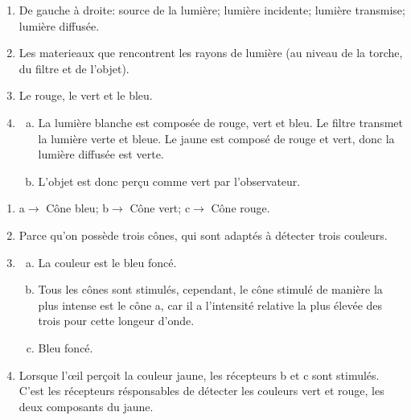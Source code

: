 \documentclass[12pt, a4paper]{article}
\begin{document}
    \begin{Exercise}[number={24}]
        \begin{enumerate}[1.]
            \item	De gauche à droite: source de la lumière; lumière incidente; lumière transmise; lumière diffusée.
            \item   Les materieaux que rencontrent les rayons de lumière (au niveau de la torche, du filtre et de l'objet).
            \item   Le rouge, le vert et le bleu.
            \item   \begin{enumerate}[a.]
                        \item   La lumière blanche est composée de rouge, vert et bleu. Le filtre transmet la lumière verte et bleue. Le jaune est composé de rouge et vert, donc la lumière diffusée est verte.
                        \item   L'objet est donc perçu comme vert par l'observateur.
                    \end{enumerate}
        \end{enumerate}
    \end{Exercise}

    \begin{Exercise}[number={27}]
        \begin{enumerate}[1.]
            \item	{\large\textcircled{\small{a}}}$\rightarrow$ Cône bleu; {\large\textcircled{\small{b}}}$\rightarrow$ Cône vert; {\large\textcircled{\small{c}}}$\rightarrow$ Cône rouge.
            \item   Parce qu'on possède trois cônes, qui sont adaptés à détecter trois couleurs.
            \item   \begin{enumerate}[a.]
                        \item	La couleur est le bleu foncé.
                        \item   Tous les cônes sont stimulés, cependant, le cône stimulé de manière la plus intense est le cône {\large\textcircled{\small{a}}}, car il a l'intensité relative la plus élevée des trois pour cette longeur d'onde.
                        \item   Bleu foncé.
                    \end{enumerate}
            \item   Lorsque l'œil perçoit la couleur jaune, les récepteurs {\large\textcircled{\small{b}}} et {\large\textcircled{\small{c}}} sont stimulés. C'est les récepteurs résponsables de détecter les couleurs vert et rouge, les deux composants du jaune.
        \end{enumerate}
    \end{Exercise}
\end{document}
